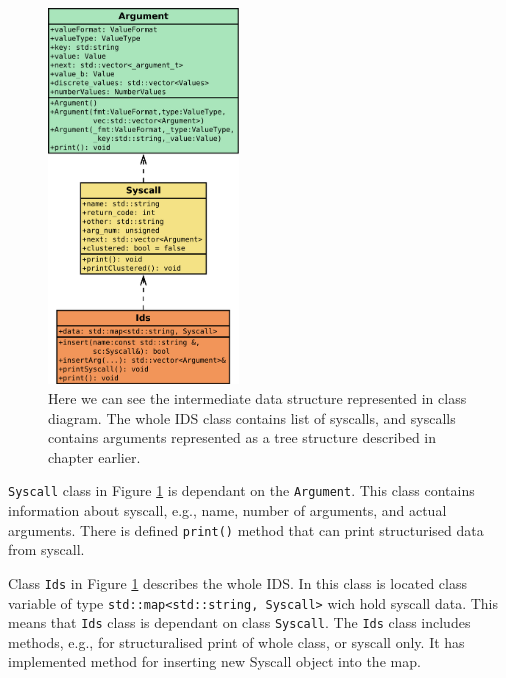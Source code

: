\begin{figure}[H]
	\centering
	\includegraphics[width=0.45\textwidth]{obrazky-figures/class/arg_sc.pdf}
	\caption{Here we can see the intermediate data structure represented in
	class diagram. The whole IDS class contains list of syscalls, and syscalls
	contains arguments represented as a tree structure described in chapter
	earlier.}
	\label{fig:class:ids}
\end{figure}

\texttt{Syscall} class in Figure \ref{fig:class:ids} is dependant  on the
\texttt{Argument}. This class contains information about syscall, e.g.,
name, number of arguments, and actual arguments. There is defined
\texttt{print()} method that can print structurised data from syscall.

Class \texttt{Ids} in Figure \ref{fig:class:ids} describes the whole IDS. In
this class is located class variable of type \texttt{std::map<std::string,
Syscall>} wich hold syscall data. This means that \texttt{Ids} class is
dependant on class \texttt{Syscall}. The \texttt{Ids} class includes methods,
e.g., for structuralised print of whole class, or syscall only. It has
implemented method for inserting new Syscall object into the map.

